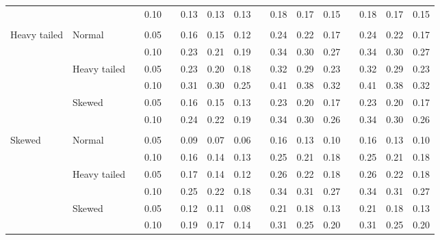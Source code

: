 \documentclass{article} %
\begin{document}
\begin{table}[ht]
\begin{scriptsize}
\begin{center}
\begin{tabular}{ll p{.1cm} c p{.1cm} rrr p{.1cm} rrr p{.1cm} rrr}
\rowcolor{gray!20}             &              && 0.10 &&   0.13 & 0.13 & 0.13 && 0.18 & 0.17 & 0.15 && 0.18 & 0.17 & 0.15 \\ 
             &&&&&&&&&&&&&&&\\
Heavy tailed & Normal       && 0.05 &&   0.16 & 0.15 & 0.12 && 0.24 & 0.22 & 0.17 && 0.24 & 0.22 & 0.17 \\ 
             &              && 0.10 &&   0.23 & 0.21 & 0.19 && 0.34 & 0.30 & 0.27 && 0.34 & 0.30 & 0.27 \\ 
             & Heavy tailed && 0.05 &&   0.23 & 0.20 & 0.18 && 0.32 & 0.29 & 0.23 && 0.32 & 0.29 & 0.23 \\ 
             &              && 0.10 &&   0.31 & 0.30 & 0.25 && 0.41 & 0.38 & 0.32 && 0.41 & 0.38 & 0.32 \\ 
             & Skewed       && 0.05 &&   0.16 & 0.15 & 0.13 && 0.23 & 0.20 & 0.17 && 0.23 & 0.20 & 0.17 \\ 
             &              && 0.10 &&   0.24 & 0.22 & 0.19 && 0.34 & 0.30 & 0.26 && 0.34 & 0.30 & 0.26 \\
             &&&&&&&&&&&&&&&\\ 
Skewed       & Normal       && 0.05 &&   0.09 & 0.07 & 0.06 && 0.16 & 0.13 & 0.10 && 0.16 & 0.13 & 0.10 \\ 
             &              && 0.10 &&   0.16 & 0.14 & 0.13 && 0.25 & 0.21 & 0.18 && 0.25 & 0.21 & 0.18 \\ 
             & Heavy tailed && 0.05 &&   0.17 & 0.14 & 0.12 && 0.26 & 0.22 & 0.18 && 0.26 & 0.22 & 0.18 \\ 
             &              && 0.10 &&   0.25 & 0.22 & 0.18 && 0.34 & 0.31 & 0.27 && 0.34 & 0.31 & 0.27 \\ 
             & Skewed       && 0.05 &&   0.12 & 0.11 & 0.08 && 0.21 & 0.18 & 0.13 && 0.21 & 0.18 & 0.13 \\ 
             &              && 0.10 &&   0.19 & 0.17 & 0.14 && 0.31 & 0.25 & 0.20 && 0.31 & 0.25 & 0.20 \\ 



\end{tabular}
\end{center}
\end{scriptsize}
\end{table}
\end{document}

